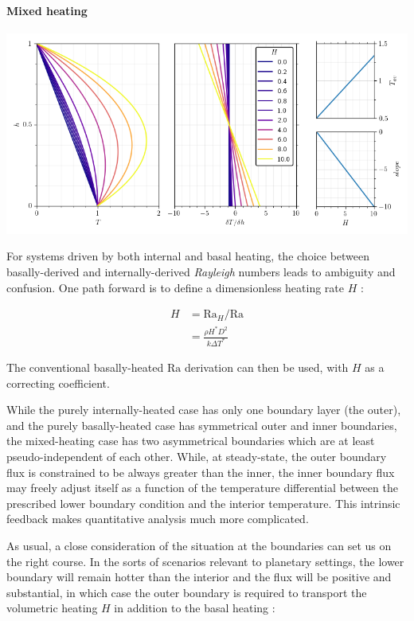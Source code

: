\documentclass[a4paper,11pt,oneside]{book}
\begin{document}
\paragraph{Mixed heating}

\includegraphics[width=0.7\linewidth]{files/545b6b3bb6664e7aace68e605ea8524a.png}

For systems driven by both internal and basal heating, the choice between basally-derived and internally-derived \textit{Rayleigh} numbers leads to ambiguity and confusion. One path forward is to define a dimensionless heating rate $H$ \cite{Schubert2001-ea}:

\begin{align*}
H &= {\mathrm{Ra}}_H / \mathrm{Ra} \\
&= \frac{\rho H^{*} D^2}{k {\Delta T}^{*}}
\end{align*}

The conventional basally-heated $\mathrm{Ra}$ derivation can then be used, with $H$ as a correcting coefficient.

While the purely internally-heated case has only one boundary layer (the outer), and the purely basally-heated case has symmetrical outer and inner boundaries, the mixed-heating case has two asymmetrical boundaries which are at least pseudo-independent of each other. While, at steady-state, the outer boundary flux is constrained to be always greater than the inner, the inner boundary flux may freely adjust itself as a function of the temperature differential between the prescribed lower boundary condition and the interior temperature. This intrinsic feedback makes quantitative analysis much more complicated.

As usual, a close consideration of the situation at the boundaries can set us on the right course. In the sorts of scenarios relevant to planetary settings, the lower boundary will remain hotter than the interior and the flux will be positive and substantial, in which case the outer boundary is required to transport the volumetric heating $H$ in addition to the basal heating \cite{Moore2008-je}:
\end{document}
